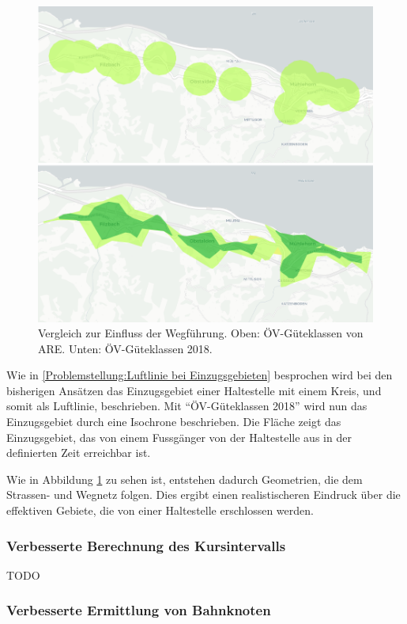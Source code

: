 \begin{figure}[ht]
    \centering
    \includegraphics[width=0.8\linewidth]{technicalreport/img/vergleich_wegfuehrung}
    \caption[Vergleich zur Einfluss der Wegführung]{Vergleich zur Einfluss der Wegführung. Oben: ÖV-Güteklassen von \ac{ARE}. Unten: ÖV-Güteklassen 2018.}
    \label{fig:vergleich_wegfuehrung}
\end{figure}

Wie in \ref{Problemstellung:Luftlinie bei Einzugsgebieten} besprochen wird bei den bisherigen Ansätzen das Einzugsgebiet einer Haltestelle mit einem Kreis, und somit als Luftlinie, beschrieben.
Mit "`\acs{ÖV}-Güteklassen 2018"' wird nun das Einzugsgebiet durch eine \gls{Isochrone} beschrieben.
Die Fläche zeigt das Einzugsgebiet, das von einem Fussgänger von der Haltestelle aus in der definierten Zeit erreichbar ist.

Wie in Abbildung \ref{fig:vergleich_wegfuehrung} zu sehen ist, entstehen dadurch Geometrien, die dem Strassen- und Wegnetz folgen.
Dies ergibt einen realistischeren Eindruck über die effektiven Gebiete, die von einer Haltestelle erschlossen werden.

\subsubsection{Verbesserte Berechnung des Kursintervalls}

TODO

\subsubsection{Verbesserte Ermittlung von Bahnknoten}

